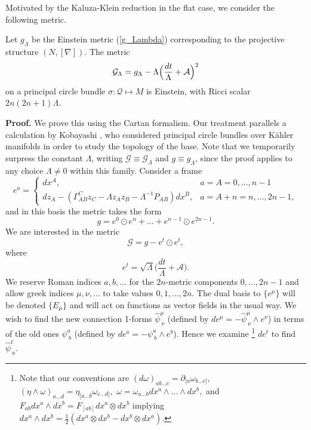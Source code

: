 Motivated by the Kaluza-Klein reduction in the flat case, we consider
the following metric.
\begin{theo}
\label{theokk}
Let $g_{\Lambda}$ be the Einstein metric
(\ref{g_Lambda}) corresponding to the projective structure $(N, [\nabla])$.
The metric
\begin{equation}
\mathcal{G}_{\Lambda}=g_{\Lambda}-\Lambda\Bigl(\frac{{d}t}{\Lambda}+\mathcal{A}\Bigr)^{2}\label{eq:G}
\end{equation}
on a principal circle bundle $\sigma:\mathcal{Q}\mapsto M$ is Einstein,
with Ricci scalar $2n(2n+1)\Lambda$.
\end{theo}
\noindent
\textbf{Proof.} We prove this using the Cartan formalism. Our treatment
parallels a calculation by Kobayashi \cite{Kob}, who considered
principal circle bundles over K\"ahler manifolds in order to study the
topology of the base. Note that we temporarily surpress the constant
$\Lambda$, writing $\mathcal{G}\equiv\mathcal{G}_{\Lambda}$ and
$g\equiv g_{\Lambda}$, since the proof applies to any choice $\Lambda\neq0$
within this family. Consider a frame
\begin{equation}
e^{a}=\begin{cases}
{d}x^{A}, & a=A=0,\dots,n-1\\
{d}z_{A}-(\Gamma_{AB}^{C}z_{C}-\Lambda z_{A}z_{B}-\Lambda^{-1}P_{AB}){d}x^{B}, & a=A+n=n,\dots,2n-1,
\end{cases}\label{eq:basis}
\end{equation}
and in this basis the metric takes the form
\begin{equation}
g=e^{0}\odot e^{n}+\dots+e^{n-1}\odot e^{2n-1}.\label{eq:g_cov_const}
\end{equation}
We are interested in the metric
\[
\mathcal{G}=g-e^{t}\odot e^{t},
\]
where
\[
e^{t}=\sqrt{\Lambda}\biggl(\frac{{d}t}{\Lambda}+{\mathcal A}\biggr).
\]
 We reserve Roman indices $a,b,\dots$ for the $2n$-metric components
$0,\dots,2n-1$ and allow greek indices $\mu,\nu,\dots$ to take values
$0,1,\dots,2n$. The dual basis to $\{e^{\mu}\}$ will be denoted
$\{E_{\mu}\}$ and will act on functions as vector fields in the usual
way. We wish to find the new connection 1-forms $\hat{\psi}_{\ \nu}^{\mu}$
(defined by ${d}e^{\mu}=-\hat{\psi}_{\ \nu}^{\mu}\wedge e^{\nu}$)
in terms of the old ones $\psi_{\ b}^{a}$ (defined by ${d}e^{a}=-\psi_{\ b}^{a}\wedge e^{b}$).
Hence we examine%
\footnote{Note that our conventions are $({d}\omega)_{ab\dots c}=\partial_{[a}\omega_{b\dots c]},$
$(\eta\wedge\omega)_{a\dots d}=\eta_{[a\dots b}\omega_{c\dots d]},$
$\omega=\omega_{a\dots b}{d}x^{a}\wedge\dots\wedge{d}x^{b},$
and $F_{ab}{d}x^{a}\wedge{d}x^{b}=F_{[ab]}{d}x^{a}\otimes{d}x^{b}$
implying ${d}x^{a}\wedge{d}x^{b}=\frac{1}{2}({d}x^{a}\otimes{d}x^{b}-{d}x^{b}\otimes{d}x^{a})$.%
} ${d}e^{t}$ to find $\hat{\psi}_{\ a}^{t}.$

